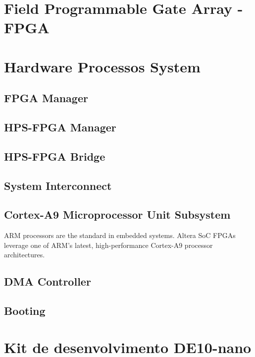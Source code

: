 
\section{Field Programmable Gate Array - FPGA}


\section{Hardware Processos System}
\subsection{FPGA Manager}
\subsection{HPS-FPGA Manager}
\subsection{HPS-FPGA Bridge}
\subsection{System Interconnect}
\subsection{Cortex-A9 Microprocessor Unit Subsystem}
ARM processors are the standard in embedded systems. Altera SoC FPGAs leverage one of ARM's latest, high-performance Cortex-A9 processor architectures.
\subsection{DMA Controller }
\subsection{Booting}


\section{Kit de desenvolvimento DE10-nano}
